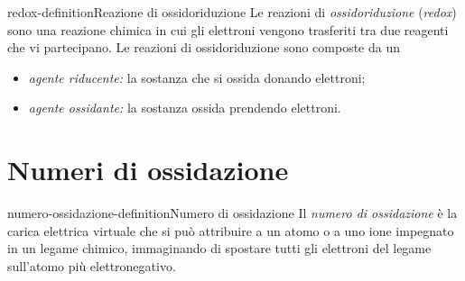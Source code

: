 \documentclass[preview]{standalone}
\begin{document}
\genpage

\begin{snippetdefinition}{redox-definition}{Reazione di ossidoriduzione}
    Le reazioni di \textit{ossidoriduzione} (\textit{redox}) sono una reazione chimica in cui gli elettroni
    vengono trasferiti tra due reagenti che vi partecipano.
    Le reazioni di ossidoriduzione sono composte da un
    \begin{itemize}
        \item \textit{agente riducente:} la sostanza che si ossida donando elettroni;
        \item \textit{agente ossidante:} la sostanza ossida prendendo elettroni.
    \end{itemize}
\end{snippetdefinition}


\section{Numeri di ossidazione}

\begin{snippetdefinition}{numero-ossidazione-definition}{Numero di ossidazione}
    Il \textit{numero di ossidazione} è la carica elettrica virtuale che si può
    attribuire a un atomo o a uno ione impegnato in un legame chimico,
    immaginando di spostare tutti gli elettroni del legame sull'atomo più elettronegativo.
\end{snippetdefinition}
\end{document}
